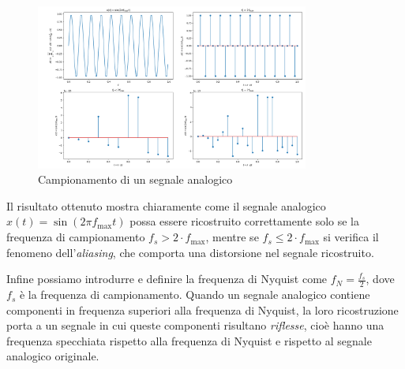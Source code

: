 \documentclass[a4paper,12pt]{report}  %
\begin{document}
\begin{figure}[h]
    \centering
    \includegraphics[width=0.8\textwidth]{imgs/nyquist-shannon.png}
    \caption{Campionamento di un segnale analogico}
    \label{fig:Nyquist-Shannon}
\end{figure}

Il risultato ottenuto mostra chiaramente come il segnale analogico $x(t) = \sin(2 \pi f_{\text{max}} t)$ possa essere ricostruito correttamente solo se la frequenza di campionamento $f_s > 2 \cdot f_{\text{max}}$, mentre se $f_s \leq 2 \cdot f_{\text{max}}$ si verifica il fenomeno dell'\textit{aliasing}, che comporta una distorsione nel segnale ricostruito.

Infine possiamo introdurre e definire la frequenza di Nyquist come $f_N = \frac{f_s}{2}$, dove $f_s$ è la frequenza di campionamento.
Quando un segnale analogico contiene componenti in frequenza superiori alla frequenza di Nyquist, la loro ricostruzione porta a un segnale in cui queste componenti risultano \textit{riflesse}, cioè hanno una frequenza specchiata rispetto alla frequenza di Nyquist e rispetto al segnale analogico originale.
\end{document}
